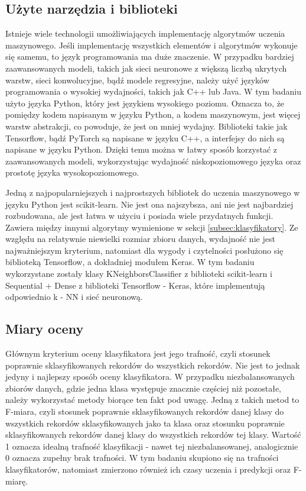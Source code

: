 \subsection{Użyte narzędzia i biblioteki}\label{subsec:narzedziaibiblioteki}
Istnieje wiele technologii umożliwiających implementację algorytmów uczenia maszynowego.
Jeśli implementację wszystkich elementów i algorytmów wykonuje się samemu, to język programowania ma duże znaczenie.
W przypadku bardziej zaawansowanych modeli, takich jak sieci neuronowe z większą liczbą ukrytych warstw, sieci konwolucyjne, bądź modele regresyjne,
należy użyć języków programowania o wysokiej wydajności, takich jak C++ lub Java. W tym badaniu użyto języka Python, który jest językiem wysokiego poziomu.
Oznacza to, że pomiędzy kodem napisanym w języku Python, a kodem maszynowym, jest więcej warstw abstrakcji, co powoduje, że jest on mniej wydajny.
Biblioteki takie jak Tensorflow, bądź PyTorch są napisane w języku C++, a interfejsy do nich są napisane w języku Python. Dzięki temu można w łatwy sposób korzystać z zaawansowanych modeli,
wykorzystując wydajność niskopoziomowego języka oraz prostotę języka wysokopoziomowego.

Jedną z najpopularniejszych i najprostszych bibliotek do uczenia maszynowego w języku Python jest scikit-learn\cite{scikit-learn}. Nie jest ona najszybsza, ani nie jest najbardziej rozbudowana,
ale jest łatwa w użyciu i posiada wiele przydatnych funkcji. Zawiera między innymi algorytmy wymienione w sekcji \ref{subsec:klasyfikatory}. Ze względu na relatywnie niewielki rozmiar zbioru danych,
wydajność nie jest najważniejszym kryterium, natomiast dla wygody i czytelności posłużono się biblioteką Tensorflow, a dokładniej modułem Keras. W tym badaniu wykorzystane zostały klasy KNeighborsClassifier z biblioteki scikit-learn i Sequential + Dense z biblioteki Tensorflow - Keras, które implementują odpowiednio k - NN i sieć neuronową.

\subsection{Miary oceny}\label{subsec:miaryoceny}
Głównym kryterium oceny klasyfikatora jest jego trafność, czyli stosunek poprawnie sklasyfikowanych rekordów do wszystkich rekordów.
Nie jest to jednak jedyny i najlepszy sposób oceny klasyfikatora. W przypadku niezbalansowanych zbiorów danych, gdzie jedna klasa występuje znacznie częściej niż pozostałe,
należy wykorzystać metody biorące ten fakt pod uwagę. Jedną z takich metod to F-miara, czyli stosunek poprawnie sklasyfikowanych rekordów danej klasy do wszystkich rekordów sklasyfikowanych
jako ta klasa oraz stosunku poprawnie sklasyfikowanych rekordów danej klasy do wszystkich rekordów tej klasy. Wartość 1 oznacza idealną trafność klasyfikacji - nawet tej niezbalansowanej, 
analogicznie 0 oznacza zupełny brak trafności. W tym badaniu skupiono się na trafności klasyfikatorów, natomiast zmierzono również ich czasy uczenia i predykcji oraz F-miarę.